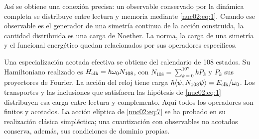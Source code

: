 Así se obtiene una conexión precisa: un observable conservado por la dinámica completa se distribuye entre lectura y memoria mediante \eqref{nuc02:eq:1}. Cuando ese observable es el generador de una simetría continua de la acción construida, la cantidad distribuida es una carga de Noether. La norma, la carga de una simetría y el funcional energético quedan relacionados por sus operadores específicos.

Una especialización acotada efectiva se obtiene del calendario de 108 estados. Su Hamiltoniano realizado es \(H_{\rm clk}=\hbar\omega_0N_{108}\), con \(N_{108}=\sum_{k=0}^{107}kP_k\) y \(P_k\) sus proyectores de Fourier. La acción del reloj tiene carga \(\hbar\langle\psi,N_{108}\psi\rangle=E_{\rm clk}/\omega_0\). Los transportes y las inclusiones que satisfacen las hipótesis de \eqref{nuc02:eq:1} distribuyen esa carga entre lectura y complemento. Aquí todos los operadores son finitos y acotados. La acción elíptica de \eqref{nuc02:eq:7} se ha probado en su realización clásica simpléctica; una cuantización con observables no acotados conserva, además, sus condiciones de dominio propias.
